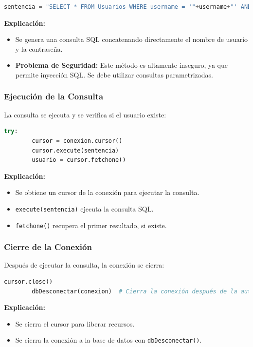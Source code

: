 \documentclass[a4paper,12pt]{article}
\begin{document}
\begin{lstlisting}[language=Python]
    sentencia = "SELECT * FROM Usuarios WHERE username = '"+username+"' AND password = '"+password+"'"
\end{lstlisting}

\textbf{Explicación:}
\begin{itemize}
    \item Se genera una consulta SQL concatenando directamente el nombre de usuario y la contraseña.
    \item \textbf{Problema de Seguridad:} Este método es altamente inseguro, ya que permite inyección SQL. Se debe utilizar consultas parametrizadas.
\end{itemize}

\subsubsection{Ejecución de la Consulta}
La consulta se ejecuta y se verifica si el usuario existe:

\begin{lstlisting}[language=Python]
    try:
        cursor = conexion.cursor()
        cursor.execute(sentencia)
        usuario = cursor.fetchone()
\end{lstlisting}

\textbf{Explicación:}
\begin{itemize}
    \item Se obtiene un cursor de la conexión para ejecutar la consulta.
    \item \texttt{execute(sentencia)} ejecuta la consulta SQL.
    \item \texttt{fetchone()} recupera el primer resultado, si existe.
\end{itemize}

\subsubsection{Cierre de la Conexión}
Después de ejecutar la consulta, la conexión se cierra:

\begin{lstlisting}[language=Python]
        cursor.close()
        dbDesconectar(conexion)  # Cierra la conexión después de la autenticación
\end{lstlisting}

\textbf{Explicación:}
\begin{itemize}
    \item Se cierra el cursor para liberar recursos.
    \item Se cierra la conexión a la base de datos con \texttt{dbDesconectar()}.
\end{itemize}
\end{document}
